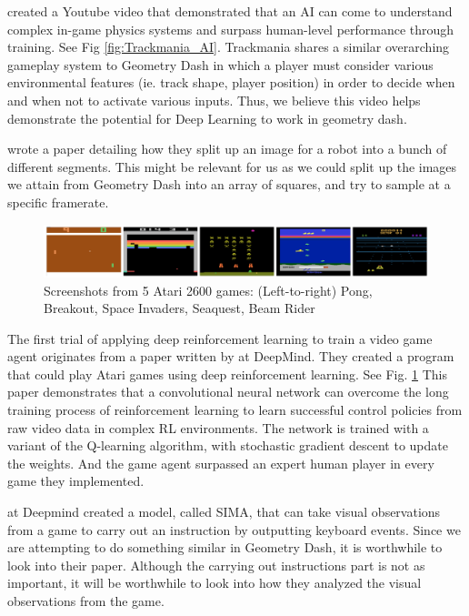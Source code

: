 \documentclass{article} %
\begin{document}
\cite{Trackmania+AI} created a Youtube video that demonstrated that an AI 
can come to understand complex in-game physics systems and surpass
human-level performance through training. See Fig \ref{fig:Trackmania_AI}.
Trackmania shares a similar overarching gameplay system to Geometry Dash in 
which a player must 
consider various environmental features (ie. track shape, player 
position) in order to decide when and when not to activate various 
inputs. Thus, we believe this video helps demonstrate the potential 
for Deep Learning to work in geometry dash.

\cite{Robot+Object+Avoidance+Method} wrote a paper detailing how 
they split up an image for a robot into a bunch of different segments. 
This might be relevant for us as we could split up the images we attain
from Geometry Dash into an array of squares, and try to sample at a
specific framerate.

\begin{figure}[!h]
\begin{center}
\includegraphics[width=1.0\textwidth]{Figs/Deepmind_atari.png}
\end{center}
\caption{Screenshots from 5 Atari 2600 games: 
(Left-to-right) Pong, Breakout, Space Invaders, Seaquest, Beam Rider
\citep{Trackmania+AI}}
\label{fig:Deep_mind_Atari_AI}
\end{figure}

The first trial of applying deep reinforcement learning to train a
video game agent originates from a paper written by
\cite{Playing+Atari+with+Deep+Reinforcement+Learning} at 
DeepMind. They created a program that could play Atari games using
deep reinforcement learning. See Fig. \ref{fig:Deep_mind_Atari_AI}
This paper demonstrates that a convolutional neural network can 
overcome the long training process of reinforcement learning to 
learn successful control policies from raw video data in complex 
RL environments. The network is trained with a variant of the 
Q-learning algorithm, with stochastic gradient descent to update 
the weights. And the game agent surpassed an expert human player 
in every game they implemented.

\cite{DeepMind+Sima} at Deepmind created a model, called SIMA, 
that can take visual observations from a game to carry out an 
instruction by outputting keyboard events. Since we are 
attempting to do something similar in Geometry Dash, it is 
worthwhile to look into their paper. Although the carrying 
out instructions part is not as important, it will be worthwhile
to look into how they analyzed the visual observations from the 
game.
\end{document}
